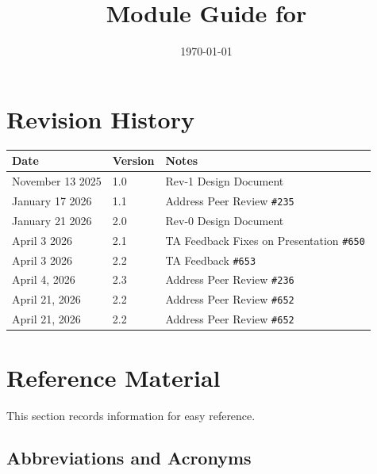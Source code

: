\documentclass[12pt, titlepage]{article}
\begin{document}
\title{Module Guide for \progname{}}
\author{\authname}
\date{\today}

\maketitle


\section{Revision History}

\begin{tabularx}{\textwidth}{p{4cm}p{2cm}X}
  \toprule {\bf Date} & {\bf Version} & {\bf Notes}\\
  \midrule
  November 13 2025 & 1.0 & Rev-1 Design Document\\
  January 17 2026 & 1.1 & Address Peer Review \texttt{\#235}\\
  January 21 2026 & 2.0 & Rev-0 Design Document\\
  April 3 2026 & 2.1 & TA Feedback Fixes on Presentation \texttt{\#650}\\
  April 3 2026 & 2.2 & TA Feedback  \texttt{\#653}\\
  April 4, 2026 & 2.3 & Address Peer Review \texttt{\#236} \\ 
  April 21, 2026 & 2.2 & Address Peer Review \texttt{\#652}\\
  April 21, 2026 & 2.2 & Address Peer Review \texttt{\#652}\\
  \bottomrule
\end{tabularx}

\newpage

\section{Reference Material}

This section records information for easy reference.

\subsection{Abbreviations and Acronyms}
\end{document}

